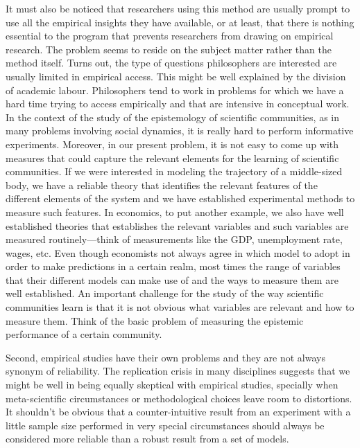 \documentclass{article}
\begin{document}
It must also be noticed that researchers using this method are usually prompt to use all the empirical insights they have available, or at least, that there is nothing essential to the program that prevents researchers from drawing on empirical research. The problem seems to reside on the subject matter rather than the method itself. Turns out, the type of questions philosophers are interested are usually limited in empirical access. This might be well explained by the division of academic labour. Philosophers tend to work in problems for which we have a hard time trying to access empirically and that are intensive in conceptual work. In the context of the study of the epistemology of scientific communities, as in many problems involving social dynamics, it is really hard to perform informative experiments. Moreover, in our present problem, it is not easy to come up with measures that could capture the relevant elements for the learning of scientific communities. If we were interested in modeling the trajectory of a middle-sized body, we have a reliable theory that identifies the relevant features of the different elements of the system and we have established experimental methods to measure such features. In economics, to put another example, we also have well established theories that establishes the relevant variables and such variables are measured routinely—think of measurements like the GDP, unemployment rate, wages, etc. Even though economists not always agree in which model to adopt in order to make predictions in a certain realm, most times the range of variables that their different models can make use of and the ways to measure them are well established.  An important challenge for the study of the way scientific communities learn is that it is not obvious what variables are relevant and how to measure them. Think of the basic problem of measuring the epistemic performance of a certain community.

Second, empirical studies have their own problems and they are not always synonym of reliability. The replication crisis in many disciplines suggests that we might be well in being equally skeptical with empirical studies, specially when meta-scientific circumstances or methodological choices leave room to distortions. It shouldn't be obvious that a counter-intuitive result from an experiment with a little sample size performed in very special circumstances should always be considered more reliable than a robust result from a set of models.
\end{document}
